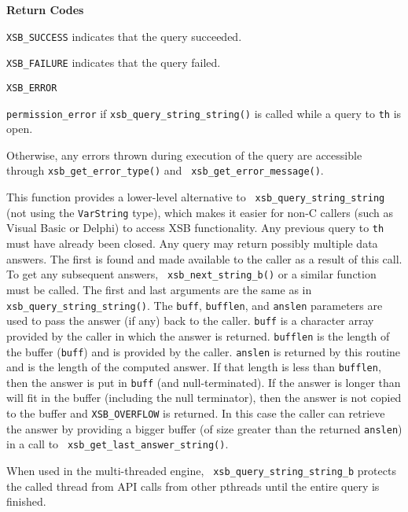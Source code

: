 \begin{description}
{\bf Return Codes}  
\bi
\item {\tt XSB\_SUCCESS} indicates that the query succeeded.
%
\item {\tt XSB\_FAILURE} indicates that the query failed.
%
\item {\tt XSB\_ERROR} 
\bi
\item {\tt permission\_error} if {\tt xsb\_query\_string\_string()} is
  called while a query to {\tt th} is open.
%
\item Otherwise, any errors thrown during execution of the query are
  accessible through {\tt xsb\_get\_error\_type()} and {\tt
    xsb\_get\_error\_message()}.  
\ei 
\ei

\item[{\mbox{\tt {\small int xsb\_query\_string\_string\_b(th\_context *th,char *query,char *buff,int bufflen,int *anslen,char *sep)}}}]
%
This function provides a lower-level alternative to {\tt
  xsb\_query\_string\_string} (not using the {\tt VarString} type),
which makes it easier for non-C callers (such as Visual Basic or
Delphi) to access XSB functionality.  Any previous query to {\tt th}
must have already been closed.  Any query may return possibly multiple
data answers.  The first is found and made available to the caller as
a result of this call.  To get any subsequent answers, {\tt
  xsb\_next\_string\_b()} or a similar function must be called.  The
first and last arguments are the same as in {\tt
  xsb\_query\_string\_string()}.  The \verb|buff|, \verb|bufflen|, and
\verb|anslen| parameters are used to pass the answer (if any) back to
the caller.  \verb|buff| is a character array provided by the caller
in which the answer is returned.  \verb|bufflen| is the length of the
buffer (\verb|buff|) and is provided by the caller.  \verb|anslen| is
returned by this routine and is the length of the computed answer.  If
that length is less than \verb|bufflen|, then the answer is put in
\verb|buff| (and null-terminated).  If the answer is longer than will
fit in the buffer (including the null terminator), then the answer is
not copied to the buffer and {\tt XSB\_OVERFLOW} is returned.  In this
case the caller can retrieve the answer by providing a bigger buffer
(of size greater than the returned \verb|anslen|) in a call to {\tt
  xsb\_get\_last\_answer\_string()}.

When used in the multi-threaded engine, {\tt
  xsb\_query\_string\_string\_b} protects the called thread from API
calls from other pthreads until the entire query is finished.


\end{description}
